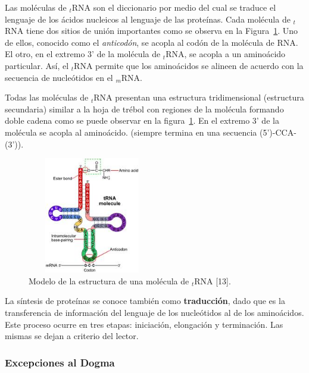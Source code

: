 Las moléculas de $_t$RNA  son el diccionario por medio del cual se traduce el lenguaje de los ácidos nucleicos al lenguaje de las proteínas. Cada molécula de $_t$RNA  tiene dos sitios de unión importantes como se observa en la Figura~\ref{ARNt}. Uno de ellos, conocido como el \textit{anticodón}, se acopla al codón de la molécula de RNA. El otro, en el extremo 3' de la molécula de $_t$RNA, se acopla a un aminoácido particular. Así, el $_t$RNA  permite que los aminoácidos se alineen de acuerdo con la secuencia de nucleótidos en el $_m$RNA.
\par Todas las moléculas de $_t$RNA  presentan una estructura tridimensional (estructura secundaria) similar a la hoja de trébol con regiones de la molécula formando doble cadena como se puede observar en la figura~\ref{ARNt}. En el extremo 3' de la molécula se acopla al aminoácido. (siempre termina en una secuencia (5')-CCA-(3')).

\begin{figure} [h]
	\hspace*{4cm}\includegraphics[width=2.2209in,height=2.0000in]{image/rnat1.jpg}
	\caption{Modelo de la estructura de una molécula de $_t$RNA [13].}	
	\label{ARNt}
\end{figure}		

La síntesis de proteínas se conoce también como \textbf{traducción}, dado que es la transferencia de información del lenguaje de los nucleótidos al de los aminoácidos. Este proceso ocurre en tres etapas: iniciación, elongación y terminación. Las mismas se dejan a criterio del lector.

\subsubsection{Excepciones al Dogma} 


